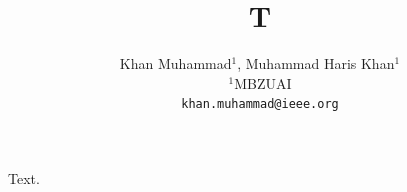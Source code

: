 \documentclass{article}
\title{T}
\author{Khan Muhammad$^{1}$, Muhammad Haris Khan$^{1}$\\ $^1$MBZUAI\\ {\tt\small khan.muhammad@ieee.org}}
\begin{document}
\maketitle
Text.
\end{document}
